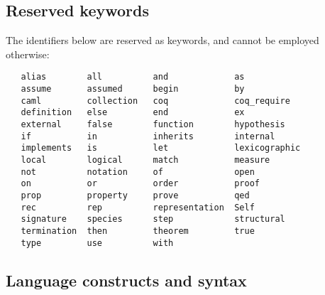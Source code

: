 \subsection{Reserved keywords}
The identifiers below are reserved as keywords, and cannot be employed
otherwise:
\begin{verbatim}
   alias        all          and             as
   assume       assumed      begin           by
   caml         collection   coq             coq_require
   definition   else         end             ex
   external     false        function        hypothesis
   if           in           inherits        internal
   implements   is           let             lexicographic
   local        logical      match           measure
   not          notation     of              open
   on           or           order           proof
   prop         property     prove           qed
   rec          rep          representation  Self
   signature    species      step            structural
   termination  then         theorem         true
   type         use          with
\end{verbatim}



\subsection{Language constructs and syntax}

